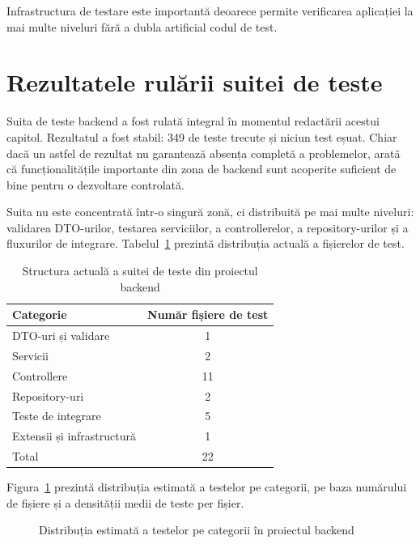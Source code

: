 Infrastructura de testare este importantă deoarece permite verificarea aplicației la mai multe niveluri fără a dubla artificial codul de test.

\section{Rezultatele rulării suitei de teste}

Suita de teste backend a fost rulată integral în momentul redactării acestui capitol. Rezultatul a fost stabil: 349 de teste trecute și niciun test eșuat. Chiar dacă un astfel de rezultat nu garantează absența completă a problemelor, arată că funcționalitățile importante din zona de backend sunt acoperite suficient de bine pentru o dezvoltare controlată.

Suita nu este concentrată într-o singură zonă, ci distribuită pe mai multe niveluri: validarea DTO-urilor, testarea serviciilor, a controllerelor, a repository-urilor și a fluxurilor de integrare. Tabelul~\ref{tab:structura-suitei-de-teste} prezintă distribuția actuală a fișierelor de test.

\begin{table}[ht]
\centering
\begin{tabular}{|l|c|}
\hline
\textbf{Categorie} & \textbf{Număr fișiere de test} \\
\hline
DTO-uri și validare & 1 \\
\hline
Servicii & 2 \\
\hline
Controllere & 11 \\
\hline
Repository-uri & 2 \\
\hline
Teste de integrare & 5 \\
\hline
Extensii și infrastructură & 1 \\
\hline
Total & 22 \\
\hline
\end{tabular}
\caption{Structura actuală a suitei de teste din proiectul backend}
\label{tab:structura-suitei-de-teste}
\end{table}

Figura~\ref{fig:distributie-nr-teste} prezintă distribuția estimată a testelor pe categorii, pe baza numărului de fișiere și a densității medii de teste per fișier.

\begin{figure}[htbp]
\centering
{}
\caption{Distribuția estimată a testelor pe categorii în proiectul backend}
\label{fig:distributie-nr-teste}
\end{figure}

